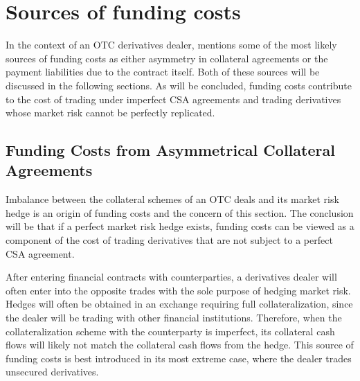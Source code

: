 \documentclass[main.tex]{subfiles}
\begin{document}
    \section{Sources of funding costs}
        In the context of an OTC derivatives dealer, 
        \textcite{Ruiz2013FVA} mentions some of the most likely sources of funding costs as
        either asymmetry in collateral agreements or the payment liabilities due to the contract itself.
        Both of these sources will be discussed in the following sections.
        As will be concluded, funding costs contribute to the cost of trading under imperfect CSA agreements 
        and trading derivatives whose market risk cannot be perfectly replicated.

    \subsection{Funding Costs from Asymmetrical Collateral Agreements}
    \label{sec:funding-asymmetric-collateral}
        Imbalance between the collateral schemes of an OTC deals and its market risk hedge
        is an origin of funding costs and the concern of this section.
        The conclusion will be that if a perfect market risk hedge exists, funding costs can be viewed 
        as a component of the cost of trading derivatives that are not subject to a perfect CSA agreement.

        After entering financial contracts with counterparties,
        a derivatives dealer will often enter into the opposite trades
        with the sole purpose of hedging market risk.
        Hedges will often be obtained in an exchange requiring full collateralization,
        since the dealer will be trading with other financial institutions.
        Therefore, when the collateralization scheme with the counterparty is imperfect, 
        its collateral cash flows will likely not match the collateral cash flows from the hedge.
        This source of funding costs is best introduced in its most extreme case, 
        where the dealer trades unsecured derivatives. 
\end{document}
